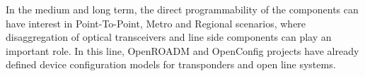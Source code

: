 \documentclass[10pt, conference]{IEEEtran}
\begin{document}
In the medium and long term, the direct programmability of the components can have interest in Point-To-Point, Metro and Regional scenarios, where disaggregation of optical transceivers and line side components can play an important role. In this line, OpenROADM \cite{oda2016learning} and OpenConfig projects have already defined device configuration models for transponders and open line systems. 

    

%

\end{document}
